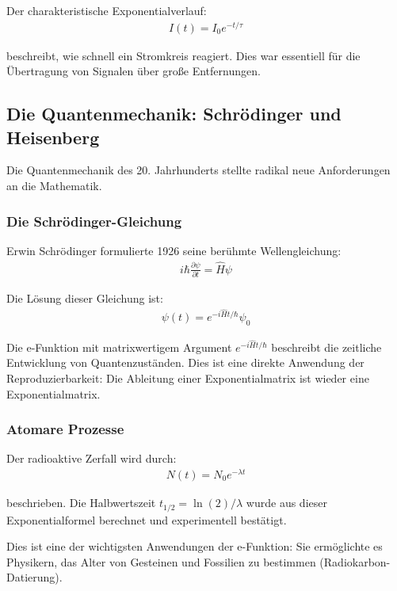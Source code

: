 \documentclass[a4paper,12pt,twoside]{report}
\theoremstyle{definition}
\begin{document}
Der charakteristische Exponentialverlauf:
\begin{align}
	I(t) = I_0 e^{-t/\tau}
\end{align}

beschreibt, wie schnell ein Stromkreis reagiert. Dies war essentiell für die Übertragung von Signalen über große Entfernungen.

\subsection{Die Quantenmechanik: Schrödinger und Heisenberg}

Die Quantenmechanik des 20. Jahrhunderts stellte radikal neue Anforderungen an die Mathematik.

\subsubsection*{Die Schrödinger-Gleichung}

Erwin Schrödinger formulierte 1926 seine berühmte Wellengleichung:
\begin{align}
	i\hbar \frac{\partial \psi}{\partial t} = \hat{H} \psi
\end{align}

Die Lösung dieser Gleichung ist:
\begin{align}
	\psi(t) = e^{-i\hat{H}t/\hbar} \psi_0
\end{align}

Die e-Funktion mit matrixwertigem Argument $e^{-i\hat{H}t/\hbar}$ beschreibt die zeitliche Entwicklung von Quantenzuständen. Dies ist eine direkte Anwendung der Reproduzierbarkeit: Die Ableitung einer Exponentialmatrix ist wieder eine Exponentialmatrix.

\subsubsection*{Atomare Prozesse}

Der radioaktive Zerfall wird durch:
\begin{align}
	N(t) = N_0 e^{-\lambda t}
\end{align}

beschrieben. Die Halbwertszeit $t_{1/2} = \ln(2)/\lambda$ wurde aus dieser Exponentialformel berechnet und experimentell bestätigt.

Dies ist eine der wichtigsten Anwendungen der e-Funktion: Sie ermöglichte es Physikern, das Alter von Gesteinen und Fossilien zu bestimmen (Radiokarbon-Datierung).
\end{document}

